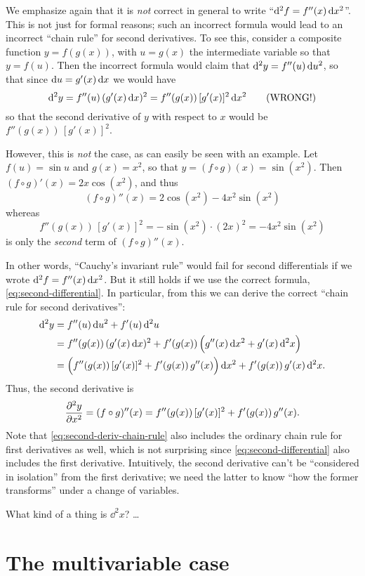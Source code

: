 \documentclass[12pt]{amsart}
\begin{document}
\begin{rmk}
  We emphasize again that it is \emph{not} correct in general to write ``$\mathrm{d}^2f = f''(x) \,\mathrm{d} x^2$''.
  This is not just for formal reasons; such an incorrect formula would lead to an incorrect ``chain rule'' for second derivatives.
  To see this, consider a composite function $y = f(g(x))$, with $u = g(x)$ the intermediate variable so that $y = f(u)$.
  Then the incorrect formula would claim that $\mathrm{d}^2y = f''(u)\,\mathrm{d} u^2 $, so that since $\mathrm{d} u = g'(x) \,\mathrm{d} x$ we would have
  \[ \mathrm{d}^2y = f''(u)\,(g'(x)\,\mathrm{d} x)^2 = f''(g(x))\, [g'(x)]^2 \,\mathrm{d} x^2 \qquad\text{(WRONG!)} \]
  so that the second derivative of $y$ with respect to $x$ would be $f''(g(x))\, [g'(x)]^2$.

  However, this is \emph{not} the case, as can easily be seen with an example.
  Let $f(u) = \sin u$ and $g(x) = x^2$, so that $y = (f\circ g)(x) = \sin(x^2)$.
  Then $(f\circ g)'(x) = 2x\cos (x^2)$, and thus
  \[ (f\circ g)''(x) = 2 \cos (x^2) - 4x^2 \sin(x^2) \]
  whereas
  \[ f''(g(x))\, [g'(x)]^2 = -\sin(x^2) \cdot (2x)^2 = -4x^2\sin(x^2) \]
  is only the \emph{second} term of $(f\circ g)''(x)$.

  In other words, ``Cauchy's invariant rule'' would fail for second differentials if we wrote $\mathrm{d}^2f = f''(x) \,\mathrm{d} x^2$.
  But it still holds if we use the correct formula, \cref{eq:second-differential}.
  In particular, from this we can derive the correct ``chain rule for second derivatives'':
  \begin{align}
    \mathrm{d}^2y &= f''(u) \,\mathrm{d} u^2 + f'(u) \,\mathrm{d}^2u \notag\\
    &= f''(g(x)) \, (g'(x) \, \mathrm{d} x)^2 + f'(g(x)) \, \Big(g''(x) \, \mathrm{d} x^2 + g'(x) \, \mathrm{d}^2 x\Big) \notag\\
    &= \Big( f''(g(x)) \,[g'(x)]^2 + f'(g(x))\, g''(x)\Big) \, \mathrm{d} x^2 + f'(g(x))\, g'(x)\,\mathrm{d}^2x. \label{eq:second-deriv-chain-rule}
  \end{align}
  Thus, the second derivative is
  \[ \frac{\partial^2 y}{\partial x^2} = (f\circ g)''(x) = f''(g(x)) \,[g'(x)]^2 + f'(g(x))\, g''(x). \]
  Note that \cref{eq:second-deriv-chain-rule} also includes the ordinary chain rule for first derivatives as well, which is not surprising since \cref{eq:second-differential} also includes the first derivative.
  Intuitively, the second derivative can't be ``considered in isolation'' from the first derivative; we need the latter to know ``how the former transforms'' under a change of variables.
\end{rmk}

What kind of a thing is $\dd^2x$? \dots %

\section{The multivariable case}
\label{sec:multivariable-second-differentials}

\end{document}
